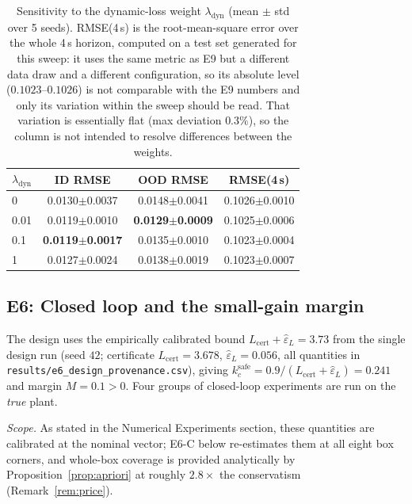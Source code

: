 \documentclass[11pt,sagev,times]{sagej}
\newcommand{\Lhat}{L_{\mathrm{cert}}}
\newcommand{\epsL}{\varepsilon_L}
\begin{document}
\begin{table}[t]
\centering\small
\caption{Sensitivity to the dynamic-loss weight $\lambda_{\mathrm{dyn}}$
(mean $\pm$ std over 5 seeds). RMSE(4\,s) is the root-mean-square error over
the whole 4\,s horizon, computed on a test set generated for this sweep: it
uses the same metric as E9 but a different data draw and a different
configuration, so its absolute level ($0.1023$--$0.1026$) is not comparable
with the E9 numbers and only its variation within the sweep should be read.
That variation is essentially flat (max deviation $0.3\%$), so the column is
not intended to resolve differences between the weights.}
\label{tab:e5lam}
\begin{tabular}{lccc}
\toprule
$\lambda_{\mathrm{dyn}}$ & ID RMSE & OOD RMSE & RMSE(4\,s) \\
\midrule
0    & 0.0130$\pm$0.0037 & 0.0148$\pm$0.0041 & 0.1026$\pm$0.0010 \\
0.01 & 0.0119$\pm$0.0010 & \textbf{0.0129$\pm$0.0009} & 0.1025$\pm$0.0006 \\
0.1  & \textbf{0.0119$\pm$0.0017} & 0.0135$\pm$0.0010 & 0.1023$\pm$0.0004 \\
1    & 0.0127$\pm$0.0024 & 0.0138$\pm$0.0019 & 0.1023$\pm$0.0007 \\
\bottomrule
\end{tabular}
\end{table}

\subsection{E6: Closed loop and the small-gain margin}
The design uses the empirically calibrated bound $\Lhat+\hat\epsL=3.73$ from
the single design run (seed $42$; certificate $\Lhat=3.678$,
$\hat\epsL=0.056$, all quantities in
\texttt{results/e6\_design\_provenance.csv}), giving
$k_c^{\mathrm{safe}}=0.9/(\Lhat+\hat\epsL)=0.241$ and margin $M=0.1>0$.
Four groups of closed-loop experiments are run on the \emph{true} plant.

\emph{Scope.} As stated in the Numerical Experiments section, these quantities are
calibrated at the nominal vector; E6-C below re-estimates them at all eight box
corners, and whole-box coverage is provided analytically by
Proposition~\ref{prop:apriori} at roughly $2.8\times$ the conservatism
(Remark~\ref{rem:price}).
\end{document}
